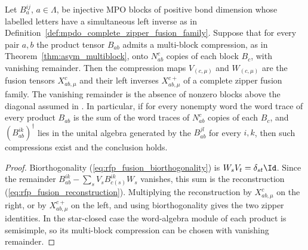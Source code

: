 \begin{lemma}%
    \label{thm:mpdo_complete_zipper_of_compression}
    \leanok
    Let $B_a^{ij}$, $a\in\Lambda$, be injective MPO blocks of positive bond
    dimension whose labelled letters have a simultaneous left inverse as in
    Definition~\ref{def:mpdo_complete_zipper_fusion_family}. Suppose that for
    every pair $a,b$ the product tensor $B_{ab}$ admits a multi-block
    compression, as in Theorem~\ref{thm:asym_multiblock}, onto $N_{ab}^{c}$
    copies of each block $B_c$, with vanishing remainder. Then the
    compression maps $V_{(c,\mu)}$ and $W_{(c,\mu)}$ are the fusion tensors
    $X^c_{ab,\mu}$ and their left inverses $X^{c+}_{ab,\mu}$ of a complete
    zipper fusion family. The vanishing remainder is the absence of nonzero
    blocks above the diagonal assumed in
    \cite[lines~181--191]{Bultinck2017Anyons}.
    In particular, if for every nonempty word the word trace of every product
    $B_{ab}$ is the sum of the word traces of $N_{ab}^{c}$ copies of each
    $B_c$, and $(B_{ab}^{ik})^\dagger$ lies in the unital algebra generated by
    the $B_{ab}^{jl}$ for every $i,k$, then such compressions exist and the
    conclusion holds.
\end{lemma}
\begin{proof}\leanok
    Biorthogonality (\ref{eq:rfp_fusion_biorthogonality}) is
    $W_sV_t=\delta_{st}\Id$. Since the remainder
    $B_{ab}^{ik}-\sum_sV_sB_{c(s)}^{ik}W_s$ vanishes, this sum is the
    reconstruction (\ref{eq:rfp_fusion_reconstruction}). Multiplying the
    reconstruction by $X^c_{ab,\mu}$ on the right, or by $X^{c+}_{ab,\mu}$ on
    the left, and using biorthogonality gives the two zipper identities.
    In the star-closed case the word-algebra module of each product is semisimple, so
    its multi-block compression can be chosen with vanishing remainder.
\end{proof}

